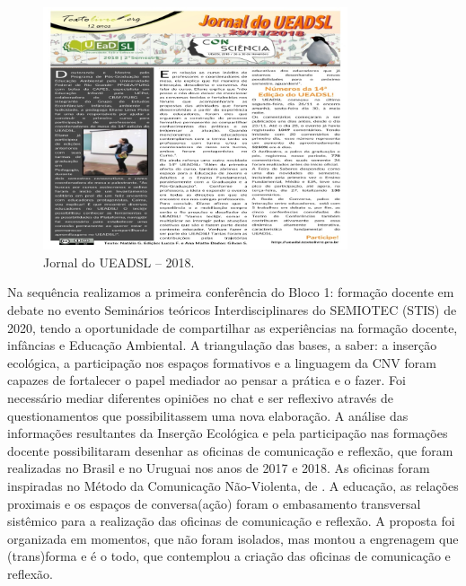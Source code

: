 \documentclass{textolivre}
\begin{document}
\begin{figure}[h!]
 \centering
 \includegraphics[width=0.8\textwidth]{figure02.png}
 \caption{Jornal do UEADSL -- 2018.}
 \label{fig-fig02}
\end{figure}

Na sequência realizamos a primeira conferência do Bloco 1: formação docente em debate no evento Seminários teóricos Interdisciplinares do SEMIOTEC (STIS) de 2020, tendo a oportunidade de compartilhar as experiências na formação docente, infâncias e Educação Ambiental. A triangulação das bases, a saber: a inserção ecológica, a participação nos espaços formativos e a linguagem da CNV foram capazes de fortalecer o papel mediador ao pensar a prática e o fazer. Foi necessário mediar diferentes opiniões no chat e ser reflexivo através de questionamentos que possibilitassem uma nova elaboração. A análise das informações resultantes da Inserção Ecológica e pela participação nas formações docente possibilitaram desenhar as oficinas de comunicação e reflexão, que foram realizadas no Brasil e no Uruguai nos anos de 2017 e 2018. As oficinas foram inspiradas no Método da Comunicação Não-Violenta, de \textcite{rosenberg2006}. A educação, as relações proximais e os espaços de conversa(ação) foram o embasamento transversal sistêmico para a realização das oficinas de comunicação e reflexão. A proposta foi organizada em momentos, que não foram isolados, mas montou a engrenagem que (trans)forma e é o todo, que contemplou a criação das oficinas de comunicação e reflexão.
\end{document}
